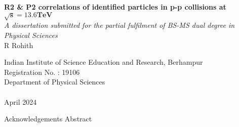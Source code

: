 \documentclass[12pt,a4paper,twoside]{report}
\newcommand{\usersetfontsize}[2]{\fontsize{#1}{#2}\selectfont}
\begin{document}
\usersetfontsize{12pt}{18pt}
\begin{titlepage}
{
	\centering
	\vspace*{2in}
	\textbf{\fontsize{16pt}{24pt}\selectfont R2 \& P2 correlations of identified particles in p-p collisions at $\mathbf{\sqrt{s}=13.6 TeV}$}%
	\\ \vspace*{0.25in}
	\textit{A dissertation submitted for the partial fulfilment of BS-MS dual degree in Physical Sciences}%
	\\ \vspace*{0.5in}
	{R Rohith}%
	\\ \vspace*{3in}
	\begin{figure}[H]
		\centering
	\end{figure}
	{\usersetfontsize{14}{21}Indian Institute of Science Education and Research, Berhampur\\Registration No. : 19106\\Department of Physical Sciences\\}~\\
	{April 2024}\\
}	
\end{titlepage}
Acknowledgements
\newpage
Abstract
\newpage
\tableofcontents
\newpage
\listoffigures
\newpage
\listoftables
\newpage
{}
\pagestyle{headings}
\end{document}
